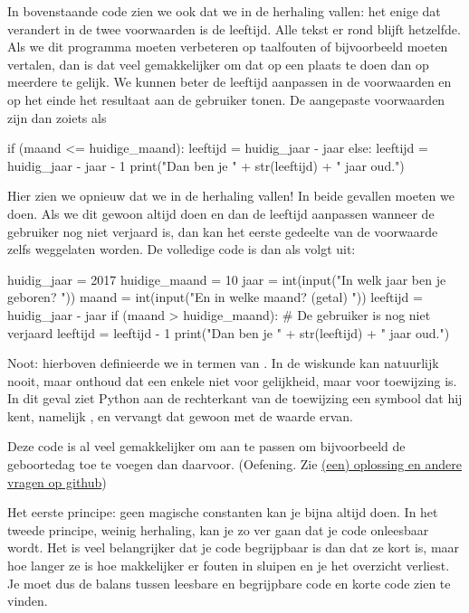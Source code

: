   In bovenstaande code zien we ook dat we in de herhaling vallen: het
  enige dat verandert in de twee voorwaarden is de leeftijd. Alle tekst er rond
  blijft hetzelfde. Als we dit programma moeten verbeteren op taalfouten of
  bijvoorbeeld moeten vertalen, dan is dat veel gemakkelijker om dat op een
  plaats te doen dan op meerdere te gelijk. We kunnen beter de leeftijd
  aanpassen in de voorwaarden en op het einde het resultaat aan de gebruiker
  tonen. De aangepaste voorwaarden zijn dan zoiets als
  \begin{python}
    if (maand <= huidige_maand):
      leeftijd = huidig_jaar - jaar
    else:
      leeftijd = huidig_jaar - jaar - 1
    print("Dan ben je " + str(leeftijd) + " jaar oud.")
  \end{python}
  Hier zien we opnieuw dat we in de herhaling vallen! In beide gevallen moeten
  we  doen. Als we dit gewoon altijd doen en dan de
  leeftijd aanpassen wanneer de gebruiker nog niet verjaard is, dan kan het
  eerste gedeelte van de voorwaarde zelfs weggelaten worden. De volledige code
  is dan als volgt uit:
  \begin{python}
    huidig_jaar   = 2017
    huidige_maand = 10
    jaar  = int(input("In welk jaar ben je geboren? "))
    maand = int(input("En in welke maand? (getal) "))
    leeftijd = huidig_jaar - jaar
    if (maand > huidige_maand):
      # De gebruiker is nog niet verjaard
      leeftijd = leeftijd - 1
    print("Dan ben je " + str(leeftijd) + " jaar oud.")
  \end{python}
  Noot: hierboven definieerde we  in termen van . In
  de wiskunde kan  natuurlijk nooit, maar onthoud dat een
  enkele \py{=} niet voor gelijkheid, maar voor toewijzing is. In dit geval ziet
  Python aan de rechterkant van de toewijzing een symbool dat hij kent, namelijk
  , en vervangt dat gewoon met de waarde ervan.

  Deze code is al veel gemakkelijker om aan te passen om bijvoorbeeld de
  geboortedag toe te voegen dan daarvoor. (Oefening. Zie
  \href{https://github.com/TGThorax/python-ka2ring/blob/master/src/leeftijd.py}%
  {(een) oplossing en andere vragen op github})

  Het eerste principe: geen magische constanten kan je bijna altijd doen. In het
  tweede principe, weinig herhaling, kan je zo ver gaan dat je code onleesbaar
  wordt. Het is veel belangrijker dat je code begrijpbaar is dan dat ze kort is,
  maar hoe langer ze is hoe makkelijker er fouten in sluipen en je het overzicht
  verliest. Je moet dus de balans tussen leesbare en begrijpbare code en korte
  code zien te vinden.

